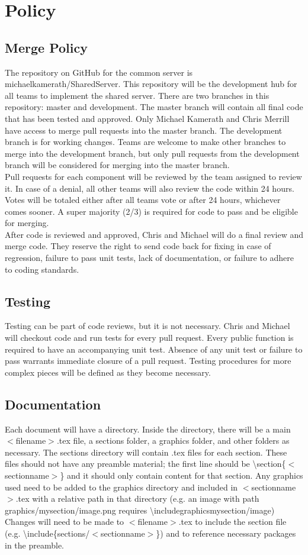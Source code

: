 \section*{Policy}
\subsection*{Merge Policy}
The repository on GitHub for the common server is michaelkamerath/SharedServer. This repository will be the development hub for all teams to implement the shared server. There are two branches in this repository: master and development. The master branch will contain all final code that has been tested and approved. Only Michael Kamerath and Chris Merrill have access to merge pull requests into the master branch. The development branch is for working changes. Teams are welcome to make other branches to merge into the development branch, but only pull requests from the development branch will be considered for merging into the master branch.\\
Pull requests for each component will be reviewed by the team assigned to review it. In case of a denial, all other teams will also review the code within 24 hours. Votes will be totaled either after all teams vote or after 24 hours, whichever comes sooner. A super majority (2/3) is required for code to pass and be eligible for merging.\\
After code is reviewed and approved, Chris and Michael will do a final review and merge code. They reserve the right to send code back for fixing in case of regression, failure to pass unit tests, lack of documentation, or failure to adhere to coding standards.
\subsection*{Testing}
Testing can be part of code reviews, but it is not necessary. Chris and Michael will checkout code and run tests for every pull request. Every public function is required to have an accompanying unit test. Absence of any unit test or failure to pass warrants immediate closure of a pull request. Testing procedures for more complex pieces will be defined as they become necessary.
\subsection*{Documentation}
Each document will have a directory. Inside the directory, there will be a main $<$filename$>$.tex file, a sections folder, a graphics folder, and other folders as necessary. The sections directory will contain .tex files for each section. These files should not have any preamble material; the first line should be \textbackslash section\{$<$sectionname$>$\} and it should only contain content for that section. Any graphics used need to be added to the graphics directory and included in $<$sectionname$>$.tex with a relative path in that directory (e.g. an image with path graphics/mysection/image.png requires \textbackslash includegraphics{mysection/image}) Changes will need to be made to $<$filename$>$.tex to include the section file (e.g. \textbackslash include\{sections/$<$sectionname$>$\}) and to reference necessary packages in the preamble.
